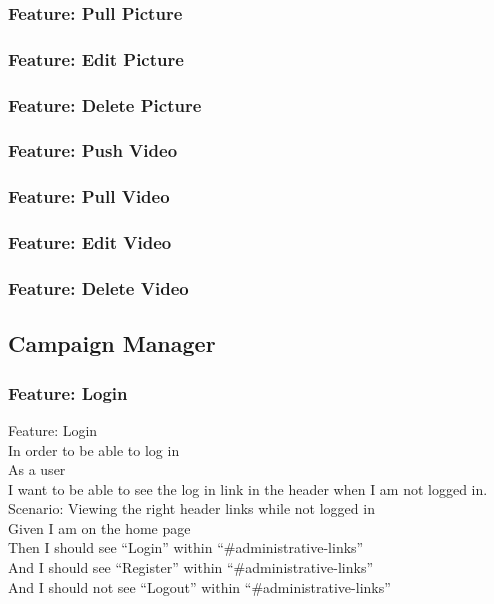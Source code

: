 \documentclass[12pt]{article}
\begin{document}
\subsubsection{Feature: Pull Picture}
\subsubsection{Feature: Edit Picture}
\subsubsection{Feature: Delete Picture}

\subsubsection{Feature: Push Video}
\subsubsection{Feature: Pull Video}
\subsubsection{Feature: Edit Video}
\subsubsection{Feature: Delete Video}

\subsection{Campaign Manager}

\subsubsection{Feature: Login}

Feature: Login \\
  In order to be able to log in \\
  As a user \\
  I want to be able to see the log in link in the header when I am not logged in. \\

Scenario: Viewing the right header links while not logged in  \\
  Given I am on the home page \\
  Then I should see ``Login'' within ``\#administrative-links'' \\
  And I should see ``Register'' within ``\#administrative-links'' \\
  And I should not see ``Logout'' within ``\#administrative-links'' \\
\end{document}
